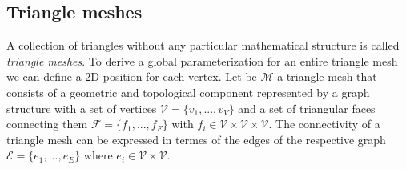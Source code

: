 \subsection{Triangle meshes}
A collection of triangles without any particular mathematical structure is called \textit{triangle meshes}. To derive a global parameterization for an entire triangle mesh we can define a 2D position for each vertex. Let be $\mathcal{M}$ a triangle mesh that consists of a geometric and topological component represented by a graph structure with a set of vertices $\mathcal{V} = \{ v_1, ..., v_V \}$ and a set of triangular faces connecting them $\mathcal{F} = \{ f_1, ... , f_F \}$ with $f_i \in \mathcal{V} \times \mathcal{V} \times \mathcal{V}$. The connectivity of a triangle mesh can be expressed in termes of the edges of the respective graph $\mathcal{E} = \{ e_1, ..., e_E \}$ where $e_i \in \mathcal{V} \times \mathcal{V}$.
\cite{polygonmeshprocessing}
